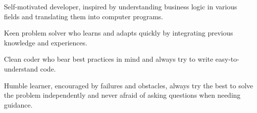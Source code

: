 

\begin{cvlist}
	\item Self-motivated developer, inspired by understanding business logic in various fields and translating them into computer programs.
	\item Keen problem solver who learns and adapts quickly by integrating previous knowledge and experiences.
	\item Clean coder who bear best practices in mind and always try to write easy-to-understand code.
	\item Humble learner, encouraged by failures and obstacles, always try the best to solve the problem independently and never afraid of asking questions when needing guidance. 
\end{cvlist}

